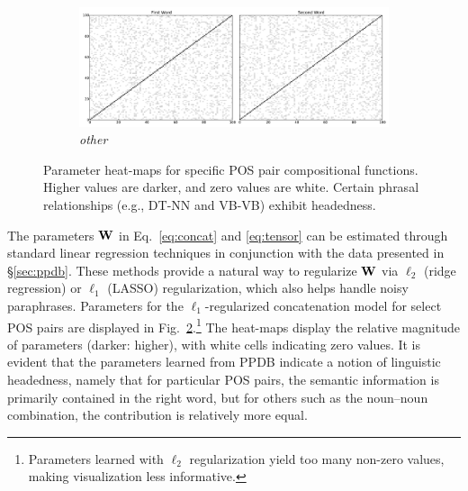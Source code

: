\documentclass[11pt,letterpaper]{article}
\newcommand{\bW}{{\bf W}}
\begin{document}
\begin{figure}[t!]
\begin{center}
\begin{subfigure}{\columnwidth}
		\centering
		\includegraphics[width=0.95\columnwidth,keepaspectratio=true]{./x_x.pdf}	
		\caption{\small \emph{other}}
		\label{fig:x_x}			
	\end{subfigure}
	\end{center}	
	\caption{Parameter heat-maps for specific POS pair compositional functions. Higher values are darker, and zero values are white. Certain phrasal relationships (e.g., DT-NN and VB-VB) exhibit headedness.}
	\label{fig:heatmaps}
\end{figure}

The parameters $\bW$ in Eq.~\ref{eq:concat} and \ref{eq:tensor} can be estimated through standard linear regression techniques in conjunction with the data presented in \S\ref{sec:ppdb}.
These methods provide a natural way to regularize $\bW$ via $\ell_2$ (ridge regression) or $\ell_1$ (LASSO) regularization, which also helps handle noisy paraphrases.  
Parameters for the $\ell_1$-regularized concatenation model for select POS pairs are displayed in Fig.~\ref{fig:heatmaps}.\footnote{Parameters learned with $\ell_2$ regularization yield too many non-zero values, making visualization less informative.}  
The heat-maps display the relative magnitude of parameters (darker: higher), with white cells indicating zero values. 
It is evident that the parameters learned from PPDB indicate a notion of linguistic headedness, namely that for particular POS pairs, the semantic information is primarily contained in the right word, but for others such as the noun--noun combination, the contribution is relatively more equal. 

\end{document}

